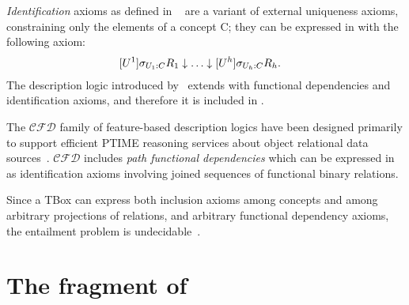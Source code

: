 \documentclass[envcountsame,draft]{llncs}
\begin{document}
\emph{Identification} axioms as defined in \DLRID~\cite{CalvaneseGL01}
are a variant of external uniqueness axioms, constraining only the elements of a concept C; they can be expressed in \DLRp with the following axiom:
%
\begin{align*}
& [U^1]\sigma_{U_1 : C} R_1\downarrow\ldots \downarrow [U^h]\sigma_{U_h : C} R_h.
\end{align*}
%
\noindent
The \DLRID description logic introduced by~\cite{CalvaneseGL01} extends \DLR with functional dependencies and identification axioms, and therefore it is included in \DLRp.

The $\mathcal{CFD}$ family of feature-based description logics have been designed primarily to support efficient PTIME reasoning services about object relational data sources~\cite{TomanW09}. $\mathcal{CFD}$ includes \emph{path functional dependencies} which can be expressed in \DLRp as identification axioms involving joined sequences of functional binary relations.

Since a \DLRp TBox can express both inclusion axioms among concepts and among arbitrary projections of relations, and arbitrary functional dependency axioms, the entailment problem is undecidable~\cite{ChandraV85}.


\section{The \DLRpm fragment of \DLRp}
\end{document}
